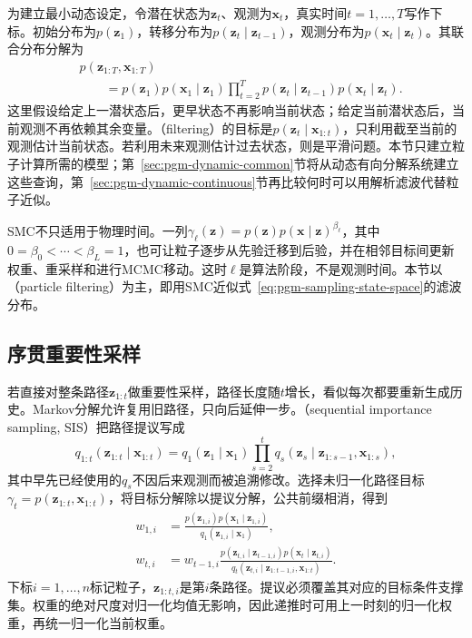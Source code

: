 为建立最小动态设定，令潜在状态为$\bm{z}_t$、观测为$\bm{x}_t$，真实时间$t=1,\ldots,T$写作下标。初始分布为$p(\bm{z}_1)$，转移分布为$p(\bm{z}_t\mid\bm{z}_{t-1})$，观测分布为$p(\bm{x}_t\mid\bm{z}_t)$。其联合分布分解为
\begin{equation}
  \begin{aligned}
    &p(\bm{z}_{1:T},\bm{x}_{1:T})\\
    &\qquad=p(\bm{z}_1)p(\bm{x}_1\mid\bm{z}_1)
       \prod_{t=2}^{T}
         p(\bm{z}_t\mid\bm{z}_{t-1})p(\bm{x}_t\mid\bm{z}_t).
  \end{aligned}
  \label{eq:pgm-sampling-state-space}
\end{equation}
这里假设给定上一潜状态后，更早状态不再影响当前状态；给定当前潜状态后，当前观测不再依赖其余变量。（filtering）的目标是$p(\bm{z}_t\mid\bm{x}_{1:t})$，只利用截至当前的观测估计当前状态。若利用未来观测估计过去状态，则是平滑问题。本节只建立粒子计算所需的模型；第~\ref{sec:pgm-dynamic-common}节将从动态有向分解系统建立这些查询，第~\ref{sec:pgm-dynamic-continuous}节再比较何时可以用解析滤波代替粒子近似。

SMC不只适用于物理时间。一列$\gamma_\ell(\bm{z})=p(\bm{z})p(\bm{x}\mid\bm{z})^{\beta_\ell}$，其中$0=\beta_0<\cdots<\beta_L=1$，也可让粒子逐步从先验迁移到后验，并在相邻目标间更新权重、重采样和进行MCMC移动。这时$\ell$是算法阶段，不是观测时间。本节以（particle filtering）为主，即用SMC近似式~\eqref{eq:pgm-sampling-state-space}的滤波分布。

\subsection{序贯重要性采样}
\label{sec:pgm-sampling-sis}

若直接对整条路径$\bm{z}_{1:t}$做重要性采样，路径长度随$t$增长，看似每次都要重新生成历史。Markov分解允许复用旧路径，只向后延伸一步。（sequential importance sampling, SIS）把路径提议写成
\[
  q_{1:t}(\bm{z}_{1:t}\mid\bm{x}_{1:t})
    =q_1(\bm{z}_1\mid\bm{x}_1)
      \prod_{s=2}^{t}
        q_s(\bm{z}_s\mid\bm{z}_{1:s-1},\bm{x}_{1:s}),
\]
其中早先已经使用的$q_s$不因后来观测而被追溯修改。选择未归一化路径目标$\gamma_t=p(\bm{z}_{1:t},\bm{x}_{1:t})$，将目标分解除以提议分解，公共前缀相消，得到
\begin{equation}
  \begin{aligned}
    w_{1,i}&=
      \frac{p(\bm{z}_{1,i})p(\bm{x}_1\mid\bm{z}_{1,i})}
           {q_1(\bm{z}_{1,i}\mid\bm{x}_1)},\\
    w_{t,i}&=w_{t-1,i}
      \frac{p(\bm{z}_{t,i}\mid\bm{z}_{t-1,i})
            p(\bm{x}_t\mid\bm{z}_{t,i})}
           {q_t(\bm{z}_{t,i}\mid\bm{z}_{1:t-1,i},\bm{x}_{1:t})}.
  \end{aligned}
  \label{eq:pgm-sampling-sis-weight}
\end{equation}
下标$i=1,\ldots,n$标记粒子，$\bm{z}_{1:t,i}$是第$i$条路径。提议必须覆盖其对应的目标条件支撑集。权重的绝对尺度对归一化均值无影响，因此递推时可用上一时刻的归一化权重，再统一归一化当前权重。

